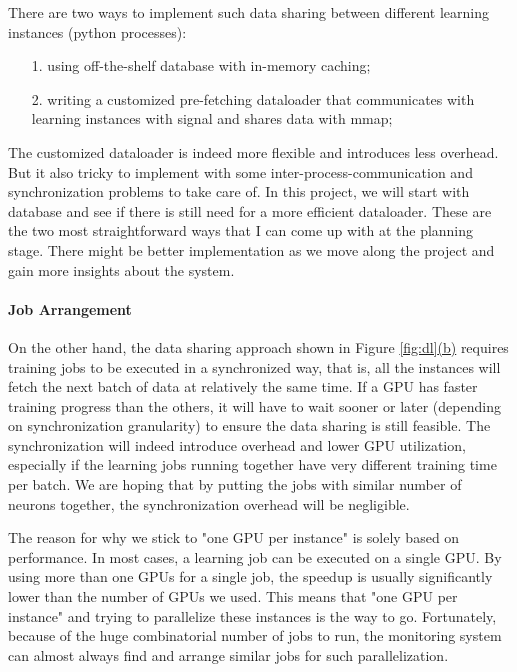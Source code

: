 \documentclass[conference]{IEEEtran}
\begin{document}
There are two ways to implement such data sharing between different learning instances (python processes): 

\begin{itemize}
	\item[1.]  using off-the-shelf database with in-memory caching;
	\item[2.]  writing a customized pre-fetching dataloader that communicates with learning instances with signal and shares data with mmap;
\end{itemize}

The customized dataloader is indeed more flexible and introduces less overhead. 
But it also tricky to implement with some inter-process-communication and synchronization problems to take care of. 
In this project, we will start with database and see if there is still need for a more efficient dataloader. 
These are the two most straightforward ways that I can come up with at the planning stage. 
There might be better implementation as we move along the project and gain more insights about the system. 

\paragraph{Job Arrangement}
On the other hand, the data sharing approach shown in Figure \ref{fig:dl}\hyperref[dl_b]{(b)} requires training jobs to be executed in a synchronized way, that is, all the instances will fetch the next batch of data at relatively the same time. 
If a GPU has faster training progress than the others, it will have to wait sooner or later (depending on synchronization granularity) to ensure the data sharing is still feasible. 
The synchronization will indeed introduce overhead and lower GPU utilization, especially if the learning jobs running together have very different training time per batch. 
We are hoping that by putting the jobs with similar number of neurons together, the synchronization overhead will be negligible. 

The reason for why we stick to "one GPU per instance" is solely based on performance. 
In most cases, a learning job can be executed on a single GPU. 
By using more than one GPUs for a single job, the speedup is usually significantly lower than the number of GPUs we used. 
This means that "one GPU per instance" and trying to parallelize these instances is the way to go. 
Fortunately, because of the huge combinatorial number of jobs to run, the monitoring system can almost always find and arrange similar jobs for such parallelization. 
\end{document}
